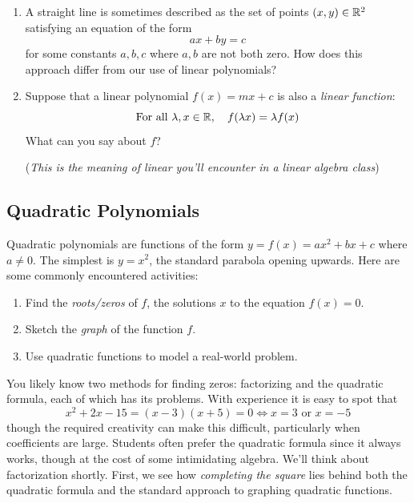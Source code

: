 \begin{exercises}{}{}
\begin{enumerate}
    
    \item A straight line is sometimes described as the set of points $(x,y)\in\mathbb{R}^2$ satisfying an equation of the form
    \[
    	ax+by=c
    \]
    for some constants $a,b,c$ where $a,b$ are not both zero. How does this approach differ from our use of linear polynomials?
    
    
    \item Suppose that a linear polynomial $f(x)=mx+c$ is also a \emph{linear function}:
    \[
    	\text{For all }\lambda,x\in\mathbb{R},\quad f(\lambda x)=\lambda f(x)
    \]
    What can you say about $f$?\par
    (\emph{This is the meaning of \emph{linear} you'll encounter in a linear algebra class})
   
  \end{enumerate}
\end{exercises}



\clearpage



\subsection{Quadratic Polynomials}

Quadratic polynomials are functions of the form $y=f(x)=ax^2+bx+c$ where $a\neq 0$. The simplest is $y=x^2$, the standard parabola opening upwards. Here are some commonly encountered activities:
\begin{enumerate}\itemsep0pt
  \item Find the \emph{roots/zeros} of $f$, the solutions $x$ to the equation $f(x)=0$.
  \item Sketch the \emph{graph} of the function $f$.
  \item Use quadratic functions to model a real-world problem.
\end{enumerate}

You likely know two methods for finding zeros: factorizing and the quadratic formula, each of which has its problems. With experience it is easy to spot that 
\[
	x^2+2x-15=(x-3)(x+5)=0\iff x=3\text{ or }x=-5
\]
though the required creativity can make this difficult, particularly when coefficients are large. Students often prefer the quadratic formula since it always works, though at the cost of some intimidating algebra. We'll think about factorization shortly. First, we see how \emph{completing the square} lies behind both the quadratic formula and the standard approach to graphing quadratic functions.

